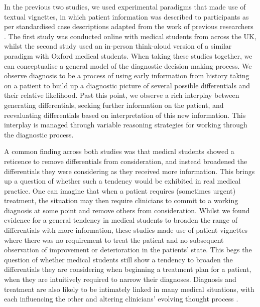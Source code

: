 \documentclass[a4paper, nobind]{templates/ociamthesis}
\begin{document}
In the previous two studies, we used experimental paradigms that made use of textual vignettes, in which patient information was described to participants as per standardised case descriptions adapted from the work of previous researchers \autocite{friedman_physicians_2005}. The first study was conducted online with medical students from across the UK, whilst the second study used an in-person think-aloud version of a similar paradigm with Oxford medical students. When taking these studies together, we can conceptualise a general model of the diagnostic decision making process. We observe diagnosis to be a process of using early information from history taking on a patient to build up a diagnostic picture of several possible differentials and their relative likelihood. Past this point, we observe a rich interplay between generating differentials, seeking further information on the patient, and reevaluating differentials based on interpretation of this new information. This interplay is managed through variable reasoning strategies for working through the diagnostic process.

\hfill\break
A common finding across both studies was that medical students showed a reticence to remove differentials from consideration, and instead broadened the differentials they were considering as they received more information. This brings up a question of whether such a tendency would be exhibited in real medical practice. One can imagine that when a patient requires (sometimes urgent) treatment, the situation may then require clinicians to commit to a working diagnosis at some point and remove others from consideration. Whilst we found evidence for a general tendency in medical students to broaden the range of differentials with more information, these studies made use of patient vignettes where there was no requirement to treat the patient and no subsequent observation of improvement or deterioration in the patients' state. This begs the question of whether medical students still show a tendency to broaden the differentials they are considering when beginning a treatment plan for a patient, when they are intuitively required to narrow their diagnoses. Diagnosis and treatment are also likely to be intimately linked in many medical situations, with each influencing the other and altering clinicians' evolving thought process \autocite{brody_diagnosis_1980}.
\end{document}
